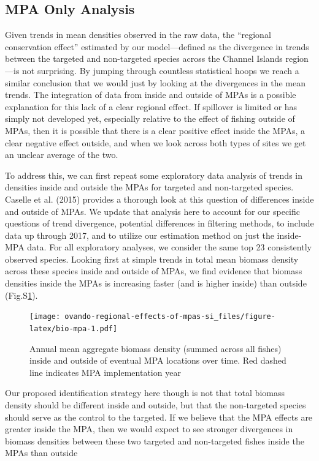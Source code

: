 \documentclass[]{article}
\begin{document}
\hypertarget{mpa-only-analysis}{%
\subsection{MPA Only Analysis}\label{mpa-only-analysis}}

Given trends in mean densities observed in the raw data, the ``regional conservation effect'' estimated by our model---defined as the divergence in trends between the targeted and non-targeted species across the Channel Islands region---is not surprising. By jumping through countless statistical hoops we reach a similar conclusion that we would just by looking at the divergences in the mean trends. The integration of data from inside and outside of MPAs is a possible explanation for this lack of a clear regional effect. If spillover is limited or has simply not developed yet, especially relative to the effect of fishing outside of MPAs, then it is possible that there is a clear positive effect inside the MPAs, a clear negative effect outside, and when we look across both types of sites we get an unclear average of the two.

To address this, we can first repeat some exploratory data analysis of trends in densities inside and outside the MPAs for targeted and non-targeted species. Caselle et al. (2015) provides a thorough look at this question of differences inside and outside of MPAs. We update that analysis here to account for our specific questions of trend divergence, potential differences in filtering methods, to include data up through 2017, and to utilize our estimation method on just the inside-MPA data. For all exploratory analyses, we consider the same top 23 consistently observed species. Looking first at simple trends in total mean biomass density across these species inside and outside of MPAs, we find evidence that biomass densities inside the MPAs is increasing faster (and is higher inside) than outside (Fig.S\ref{fig:bio-mpa}).

\begin{figure}
\centering
\texttt{[image: ovando-regional-effects-of-mpas-si\_files/figure-latex/bio-mpa-1.pdf]}
\caption{\label{fig:bio-mpa}Annual mean aggregate biomass density (summed across all fishes) inside and outside of eventual MPA locations over time. Red dashed line indicates MPA implementation year}
\end{figure}

Our proposed identification strategy here though is not that total biomass density should be different inside and outside, but that the non-targeted species should serve as the control to the targeted. If we believe that the MPA effects are greater inside the MPA, then we would expect to see stronger divergences in biomass densities between these two targeted and non-targeted fishes inside the MPAs than outside
\end{document}
